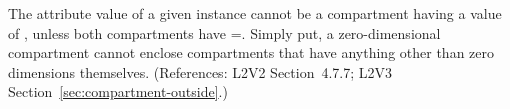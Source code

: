 The  attribute value of a given \Compartment
instance cannot be a compartment having a  value of
, unless both compartments have =.
Simply put, a zero-dimensional compartment cannot enclose compartments that
have anything other than zero dimensions themselves.  (References: L2V2
Section~4.7.7; L2V3 Section~\ref{sec:compartment-outside}.)
